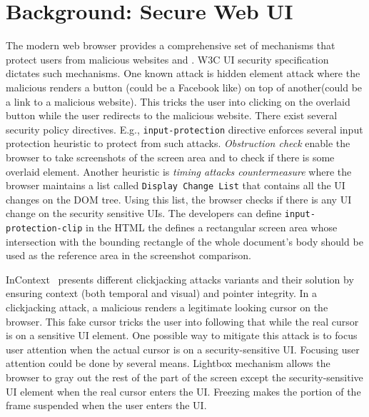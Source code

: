 \section{Background: Secure Web UI}
\label{sec:background}

The modern web browser provides a comprehensive set of mechanisms that protect users from malicious websites and \js. W3C UI security specification~\cite{w3c_spec} dictates such mechanisms. One known attack is hidden element attack where the malicious \js renders a button (could be a Facebook like) on top of another(could be a link to a malicious website). This tricks the user into clicking on the overlaid button while the user redirects to the malicious website. There exist several security policy directives. E.g., \texttt{input-protection} directive enforces several input protection heuristic to protect from such attacks.  \emph{Obstruction check} enable the browser to take screenshots of the screen area and to check if there is some overlaid element. Another heuristic is \emph{timing attacks countermeasure} where the browser maintains a list called \texttt{Display Change List} that contains all the UI changes on the DOM tree. Using this list, the browser checks if there is any UI change on the security sensitive UIs. The developers can define \texttt{input-protection-clip} in the HTML the defines a rectangular screen area whose intersection with the bounding rectangle of the whole document's body should be used as the reference area in the screenshot comparison.

InContext~\cite{huang2012clickjacking} presents different clickjacking attacks variants and their solution by ensuring context (both temporal and visual) and pointer integrity. In a clickjacking attack, a malicious \js renders a legitimate looking cursor on the browser. This fake cursor tricks the user into following that while the real cursor is on a sensitive UI element. One possible way to mitigate this attack is to focus user attention when the actual cursor is on a security-sensitive UI. Focusing user attention could be done by several means. Lightbox mechanism allows the browser to gray out the rest of the part of the screen except the security-sensitive UI element when the real cursor enters the UI. Freezing makes the portion of the frame suspended when the user enters the UI. %
